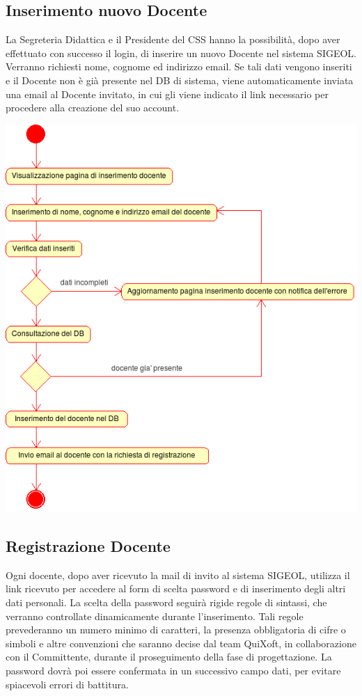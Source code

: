 \documentclass[11pt,a4paper]{article}
\begin{document}
\subsection{Inserimento nuovo Docente}
La Segreteria Didattica e il Presidente del CSS hanno la possibilità, dopo aver effettuato con successo il login, di inserire un nuovo Docente nel sistema SIGEOL. Verranno richiesti nome, cognome ed indirizzo email. Se tali dati vengono inseriti e il Docente non è già presente nel DB di sistema, viene automaticamente inviata una email al Docente invitato, in cui gli viene indicato il link necessario per procedere alla creazione del suo account.
\begin{center}
 \includegraphics[scale=0.9]{images/inserimento_docente.png}
\end{center}

\newpage
\subsection{Registrazione Docente}
Ogni docente, dopo aver ricevuto la mail di invito al sistema SIGEOL, utilizza il link ricevuto per accedere al form di scelta password e di inserimento degli altri dati personali. La scelta della password seguirà rigide regole di sintassi, che verranno controllate dinamicamente durante l'inserimento. Tali regole prevederanno un numero minimo di caratteri, la presenza obbligatoria di cifre o simboli e altre convenzioni che saranno decise dal team QuiXoft, in collaborazione con il Committente, durante il proseguimento della fase di progettazione. La password dovrà poi essere confermata in un successivo campo dati, per evitare spiacevoli errori di battitura.
\end{document}

